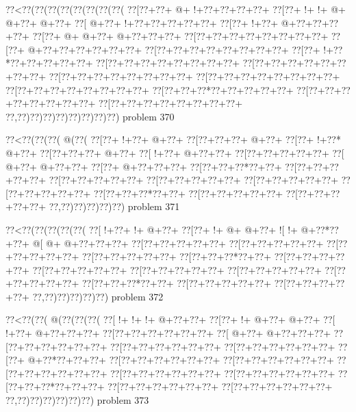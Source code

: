 \vbox{\vbox{\goo
\0??<\0??(\0??(\0??(\0??(\0??(\0??(\0??(\0??(
\0??[\0??+\0??+\- @+\- !+\0??+\0??+\0??+\0??+
\0??[\0??+\- !+\- !+\- @+\- @+\0??+\- @+\0??+
\0??[\- @+\0??+\- !+\0??+\0??+\0??+\0??+\0??+
\0??[\0??+\- !+\0??+\- @+\0??+\0??+\0??+\0??+
\0??[\0??+\- @+\- @+\0??+\- @+\0??+\0??+\0??+
\0??[\0??+\0??+\0??+\0??+\0??+\0??+\0??+\0??+
\0??[\0??+\- @+\0??+\0??+\0??+\0??+\0??+\0??+
\0??[\0??+\0??+\0??+\0??+\0??+\0??+\0??+\0??+
\0??[\0??+\- !+\0??*\0??+\0??+\0??+\0??+\0??+
\0??[\0??+\0??+\0??+\0??+\0??+\0??+\0??+\0??+
\0??[\0??+\0??+\0??+\0??+\0??+\0??+\0??+\0??+
\0??[\0??+\0??+\0??+\0??+\0??+\0??+\0??+\0??+
\0??[\0??+\0??+\0??+\0??+\0??+\0??+\0??+\0??+
\0??[\0??+\0??+\0??+\0??+\0??+\0??+\0??+\0??+
\0??[\0??+\0??+\0??*\0??+\0??+\0??+\0??+\0??+
\0??[\0??+\0??+\0??+\0??+\0??+\0??+\0??+\0??+
\0??[\0??+\0??+\0??+\0??+\0??+\0??+\0??+\0??+
\0??,\0??)\0??)\0??)\0??)\0??)\0??)\0??)\0??)
}
\hfil problem 370\hfil\break
}

\vbox{\vbox{\goo
\0??<\0??(\0??(\0??(\- @(\0??(
\0??[\0??+\- !+\0??+\- @+\0??+
\0??[\0??+\0??+\0??+\- @+\0??+
\0??[\0??+\- !+\0??*\- @+\0??+
\0??[\0??+\0??+\0??+\- @+\0??+
\0??[\- !+\0??+\- @+\0??+\0??+
\0??[\0??+\0??+\0??+\0??+\0??+
\0??[\- @+\0??+\- @+\0??+\0??+
\0??[\0??+\- @+\0??+\0??+\0??+
\0??[\0??+\0??+\0??*\0??+\0??+
\0??[\0??+\0??+\0??+\0??+\0??+
\0??[\0??+\0??+\0??+\0??+\0??+
\0??[\0??+\0??+\0??+\0??+\0??+
\0??[\0??+\0??+\0??+\0??+\0??+
\0??[\0??+\0??+\0??+\0??+\0??+
\0??[\0??+\0??+\0??*\0??+\0??+
\0??[\0??+\0??+\0??+\0??+\0??+
\0??[\0??+\0??+\0??+\0??+\0??+
\0??,\0??)\0??)\0??)\0??)\0??)
}
\hfil problem 371\hfil\break
}

\vbox{\vbox{\goo
\0??<\0??(\0??(\0??(\0??(\0??(
\0??[\- !+\0??+\- !+\- @+\0??+
\0??[\0??+\- !+\- @+\- @+\0??+
\- ![\- !+\- @+\0??*\0??+\0??+
\- @[\- @+\- @+\0??+\0??+\0??+
\0??[\0??+\0??+\0??+\0??+\0??+
\0??[\0??+\0??+\0??+\0??+\0??+
\0??[\0??+\0??+\0??+\0??+\0??+
\0??[\0??+\0??+\0??+\0??+\0??+
\0??[\0??+\0??+\0??*\0??+\0??+
\0??[\0??+\0??+\0??+\0??+\0??+
\0??[\0??+\0??+\0??+\0??+\0??+
\0??[\0??+\0??+\0??+\0??+\0??+
\0??[\0??+\0??+\0??+\0??+\0??+
\0??[\0??+\0??+\0??+\0??+\0??+
\0??[\0??+\0??+\0??*\0??+\0??+
\0??[\0??+\0??+\0??+\0??+\0??+
\0??[\0??+\0??+\0??+\0??+\0??+
\0??,\0??)\0??)\0??)\0??)\0??)
}
\hfil problem 372\hfil\break
}

\vbox{\vbox{\goo
\0??<\0??(\0??(\- @(\0??(\0??(\0??(
\0??[\- !+\- !+\- !+\- @+\0??+\0??+
\0??[\0??+\- !+\- @+\0??+\- @+\0??+
\0??[\- !+\0??+\- @+\0??+\0??+\0??+
\0??[\0??+\0??+\0??+\0??+\0??+\0??+
\0??[\- @+\0??+\- @+\0??+\0??+\0??+
\0??[\0??+\0??+\0??+\0??+\0??+\0??+
\0??[\0??+\0??+\0??+\0??+\0??+\0??+
\0??[\0??+\0??+\0??+\0??+\0??+\0??+
\0??[\0??+\- @+\0??*\0??+\0??+\0??+
\0??[\0??+\0??+\0??+\0??+\0??+\0??+
\0??[\0??+\0??+\0??+\0??+\0??+\0??+
\0??[\0??+\0??+\0??+\0??+\0??+\0??+
\0??[\0??+\0??+\0??+\0??+\0??+\0??+
\0??[\0??+\0??+\0??+\0??+\0??+\0??+
\0??[\0??+\0??+\0??*\0??+\0??+\0??+
\0??[\0??+\0??+\0??+\0??+\0??+\0??+
\0??[\0??+\0??+\0??+\0??+\0??+\0??+
\0??,\0??)\0??)\0??)\0??)\0??)\0??)
}
\hfil problem 373\hfil\break
}

